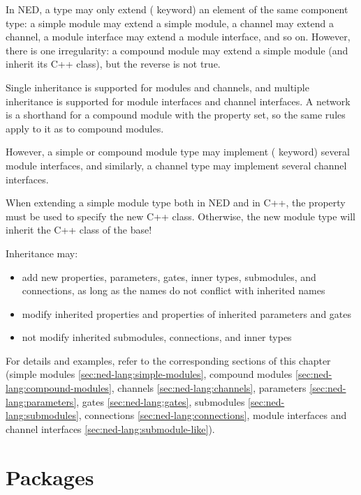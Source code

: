 In NED, a type may only extend ( keyword) an element of the
same component type: a simple module may extend a simple module, a channel may
extend a channel, a module interface may extend a module interface, and so on.
However, there is one irregularity: a compound module may extend a simple module
(and inherit its C++ class), but the reverse is not true.

Single inheritance is supported for modules and channels, and multiple
inheritance is supported for module interfaces and channel interfaces. A network
is a shorthand for a compound module with the  property set,
so the same rules apply to it as to compound modules.

However, a simple or compound module type may implement (
keyword) several module interfaces, and similarly, a channel type may implement
several channel interfaces.

\begin{important}
    When extending a simple module type both in NED and in C++, the
     property must be used to specify the new C++ class.
    Otherwise, the new module type will inherit the C++ class of the base!
\end{important}

Inheritance may:
\begin{itemize}
  \item add new properties, parameters, gates, inner types, submodules, and
    connections, as long as the names do not conflict with inherited names
  \item modify inherited properties and properties of inherited parameters and gates
  \item not modify inherited submodules, connections, and inner types
\end{itemize}

For details and examples, refer to the corresponding sections of this chapter
(simple modules \ref{sec:ned-lang:simple-modules}, compound modules
\ref{sec:ned-lang:compound-modules}, channels \ref{sec:ned-lang:channels},
parameters \ref{sec:ned-lang:parameters}, gates \ref{sec:ned-lang:gates},
submodules \ref{sec:ned-lang:submodules}, connections
\ref{sec:ned-lang:connections}, module interfaces and channel interfaces
\ref{sec:ned-lang:submodule-like}).



\section{Packages}
\label{sec:ned-lang:packages}

